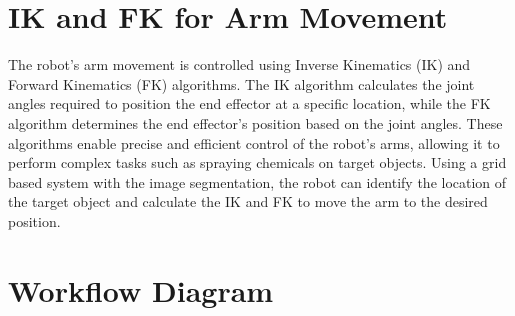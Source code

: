 \section{IK and FK for Arm Movement}

The robot's arm movement is controlled using Inverse Kinematics (IK) and Forward Kinematics (FK) algorithms. The IK algorithm calculates the joint angles required to position the end effector at a specific location, while the FK algorithm determines the end effector's position based on the joint angles. These algorithms enable precise and efficient control of the robot's arms, allowing it to perform complex tasks such as spraying chemicals on target objects.
Using a grid based system with the image segmentation, the robot can identify the location of the target object and calculate the IK and FK to move the arm to the desired position.


\section{Workflow Diagram}

